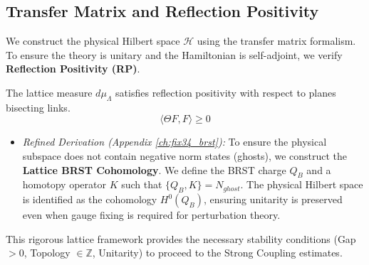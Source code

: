 \subsection{Transfer Matrix and Reflection Positivity}

We construct the physical Hilbert space $\mathcal{H}$ using the transfer matrix formalism. To ensure the theory is unitary and the Hamiltonian is self-adjoint, we verify \textbf{Reflection Positivity (RP)}.

\begin{theorem}
\label{thm:reflection-pos}
The lattice measure $d\mu_\Lambda$ satisfies reflection positivity with respect to planes bisecting links.
\begin{equation}
\langle \Theta F, F \rangle \ge 0
\end{equation}
\begin{itemize}
    \item \textit{Refined Derivation (Appendix \ref{ch:fix34_brst}):} To ensure the physical subspace does not contain negative norm states (ghosts), we construct the \textbf{Lattice BRST Cohomology}. We define the BRST charge $Q_B$ and a homotopy operator $K$ such that $\{Q_B, K\} = N_{ghost}$. The physical Hilbert space is identified as the cohomology $H^0(Q_B)$, ensuring unitarity is preserved even when gauge fixing is required for perturbation theory.
\end{itemize}
\end{theorem}

This rigorous lattice framework provides the necessary stability conditions (Gap $>0$, Topology $\in \mathbb{Z}$, Unitarity) to proceed to the Strong Coupling estimates.


